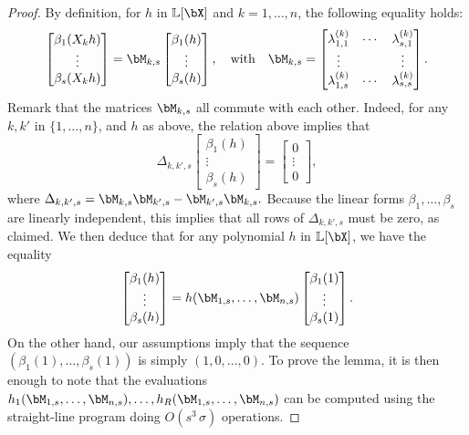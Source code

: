 \documentclass[12pt]{article}
\begin{document}
\begin{proof}
  By definition, for $h$ in $\LL[\bX]$ and $k=1,\dots,n$, the following equality
  holds:
$$
  \begin{bmatrix}
    \beta_1(X_k h)\\
    \vdots\\
    \beta_s(X_k h)
  \end{bmatrix}=
\bM_{k,s}
  \begin{bmatrix}
    \beta_1(h)\\
    \vdots\\
    \beta_s(h)
  \end{bmatrix},
\quad\text{with}\quad
\bM_{k,s}= \begin{bmatrix}
    \lambda^{(k)}_{1,1} & \cdots & \lambda^{(k)}_{s,1}\\
    \vdots && \vdots \\
    \lambda^{(k)}_{1,s} & \cdots & \lambda^{(k)}_{s,s}
  \end{bmatrix}.
$$ 
 Remark that the matrices $\bM_{k,s}$ all commute with each other. Indeed, 
for any $k,k'$ in $\{1,\dots,n\}$, and $h$ as above, the relation above implies
that 
$$
\Delta_{k,k',s}
  \begin{bmatrix}
    \beta_1(h)\\
    \vdots\\
    \beta_s(h)
  \end{bmatrix} =
  \begin{bmatrix}
0\\ \vdots \\ 0 
  \end{bmatrix},
$$
where $\Delta_{k,k',s} = \bM_{k,s}\bM_{k',s}-\bM_{k',s}\bM_{k,s}.$ Because 
the linear forms $\beta_1,\dots,\beta_s$ are linearly independent, this implies
that all rows of $\Delta_{k,k',s}$ must be zero, as claimed.
We then deduce that for any polynomial $h$ in $\LL[\bX]$, we have
the equality
$$  \begin{bmatrix}
    \beta_1(h)\\
    \vdots\\
    \beta_s(h)
  \end{bmatrix} =
h(\bM_{1,s},\dots,\bM_{n,s})   \begin{bmatrix}
    \beta_1(1)\\
    \vdots\\
    \beta_s(1)
  \end{bmatrix}. $$ On the other hand, our assumptions imply that the
  sequence $(\beta_1(1),\dots,\beta_s(1))$ is simply $(1,0,\dots,0)$.
  To prove the lemma, it is then enough to note that the evaluations \sloppy
  $h_1(\bM_{1,s},\dots,\bM_{n,s}),\dots,h_R(\bM_{1,s},\dots,\bM_{n,s})$
  can be computed using the straight-line program doing
  $O(s^3\,\sigma)$ operations.
\end{proof}
\end{document}
